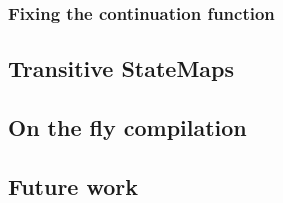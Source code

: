 \subsubsection{Fixing the continuation function}
\subsection{Transitive StateMaps}
\subsection{On the fly compilation}

\subsection{Future work}

